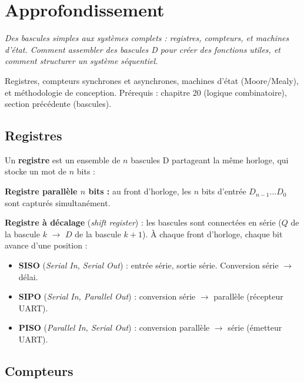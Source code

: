 \documentclass[12pt,a4paper,twoside]{book}
\begin{document}
\section{Approfondissement}

\vspace{0.3cm}
\textit{Des bascules simples aux systèmes complets : registres, compteurs, et machines d'état. Comment assembler des bascules D pour créer des fonctions utiles, et comment structurer un système séquentiel.}
\vspace{0.3cm}

\begin{approfondissement}
Registres, compteurs synchrones et asynchrones, machines d'état (Moore/Mealy), et méthodologie de conception. Prérequis : chapitre 20 (logique combinatoire), section précédente (bascules).
\end{approfondissement}

\subsection{Registres}

Un \textbf{registre} est un ensemble de $n$ bascules D partageant la même horloge, qui stocke un mot de $n$ bits :

\begin{formule}
\textbf{Registre parallèle $n$ bits :} au front d'horloge, les $n$ bits d'entrée $D_{n-1}\ldots D_0$ sont capturés simultanément.

\textbf{Registre à décalage} (\textit{shift register}) : les bascules sont connectées en série ($Q$ de la bascule $k$ $\to$ $D$ de la bascule $k+1$). À chaque front d'horloge, chaque bit avance d'une position :
\begin{itemize}[nosep]
\item \textbf{SISO} (\textit{Serial In, Serial Out}) : entrée série, sortie série. Conversion série $\to$ délai.
\item \textbf{SIPO} (\textit{Serial In, Parallel Out}) : conversion série $\to$ parallèle (récepteur UART).
\item \textbf{PISO} (\textit{Parallel In, Serial Out}) : conversion parallèle $\to$ série (émetteur UART).
\end{itemize}
\end{formule}

\subsection{Compteurs}
\end{document}
